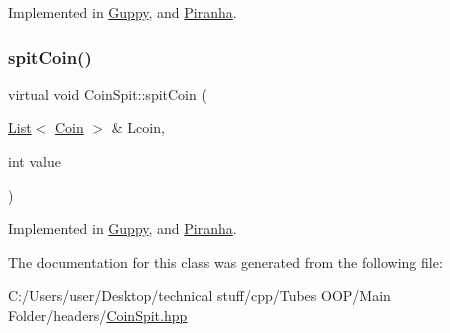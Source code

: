 Implemented in \mbox{\hyperlink{class_guppy_abab3975de3a054b14aa3b8e664e30b5b}{Guppy}}, and \mbox{\hyperlink{class_piranha_a9db3ab2f9933739f5744e881f9ee386e}{Piranha}}.

\mbox{\label{class_coin_spit_a336f45a90c4b0b57017b45a5c68f12a7}} 
\subsubsection{\texorpdfstring{spit\+Coin()}{spitCoin()}}
{\footnotesize\ttfamily virtual void Coin\+Spit\+::spit\+Coin (\begin{DoxyParamCaption}\item[{\mbox{\hyperlink{class_list}{List}}$<$ \mbox{\hyperlink{class_coin}{Coin}} $>$ \&}]{Lcoin,  }\item[{int}]{value }\end{DoxyParamCaption})\hspace{0.3cm}{\ttfamily [pure virtual]}}



Implemented in \mbox{\hyperlink{class_guppy_a39dfc2b44aed14f056bddcc08ff7c598}{Guppy}}, and \mbox{\hyperlink{class_piranha_a4c1c29b2e68b4cb6eb2a295af74bf291}{Piranha}}.



The documentation for this class was generated from the following file\+:\begin{DoxyCompactItemize}
\item 
C\+:/\+Users/user/\+Desktop/technical stuff/cpp/\+Tubes O\+O\+P/\+Main Folder/headers/\mbox{\hyperlink{_coin_spit_8hpp}{Coin\+Spit.\+hpp}}\end{DoxyCompactItemize}

